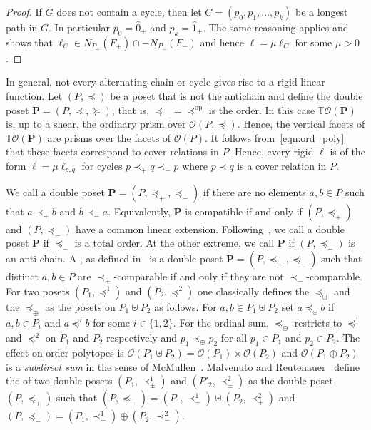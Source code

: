 \documentclass[11pt]{amsart}
\theoremstyle{definition}
\begin{document}
\begin{proof}
    If $G$ does not contain a cycle, then let $C = (p_0,p_1,\dots,p_k)$ be a
    longest path in $G$. In particular $p_0 = {\widehat{0}}_{\pm}$ and $p_k =
    {\widehat{1}}_{\pm}$. The same reasoning applies and shows that $\ell_C \in
    {N}_{{P}_+}(F_+) \cap -{N}_{{P}_-}(F_-)$ and hence $\ell = \mu
    \ell_C$ for some $\mu > 0$. 
\end{proof}

In general, not every alternating chain or cycle gives rise to a rigid linear
function. Let $({P},\preceq)$ be a poset that is not the antichain and define
the double poset ${\mathbf{P}} = ({P},\preceq,\succeq)$, that is, $\preceq_- =
\preceq^{\mathrm{op}}$ is the {\textbf{\color{black}{opposite}}} order. In this case
${{\mathbb{T}}{\mathcal{O}({\mathbf{P}})}}$ is, up to a shear, the ordinary prism over
${\mathcal{O}({{P},\preceq})}$. Hence, the vertical facets of ${{\mathbb{T}}{\mathcal{O}({\mathbf{P}})}}$ are prisms over
the facets of ${\mathcal{O}({P})}$. It follows from~\eqref{eqn:ord_poly} that these
facets correspond to cover relations in ${P}$. Hence, every rigid $\ell$ is of
the form $\ell = \mu \ell_{p,q}$ for cycles $p \prec_+ q \prec_- p$ where $p
\prec q$ is a cover relation in ${P}$.

We call a double poset ${\mathbf{P}} = ({P},\preceq_+,\preceq_-)$ {\textbf{\color{black}{compatible}}} if
there are no elements $a,b \in {P}$ such that $a \prec_+ b$ and $b \prec_- a$.
Equivalently, ${\mathbf{P}}$ is compatible if and only if $({P},\preceq_+)$ and
$({P},\preceq_-)$ have a common linear extension.
Following~\cite{MR}, we call a double poset ${\mathbf{P}}$
{\textbf{\color{black}{special}}} if $\preceq_-$ is a total order. At the other
extreme, we call ${\mathbf{P}}$ {\textbf{\color{black}{anti-special}}} if $({P},\preceq_-)$ is an anti-chain. A
{\textbf{\color{black}{plane poset}}}, as defined in~\cite{Foissy1} is a double poset
${\mathbf{P}} = ({P},\preceq_+,\preceq_-)$ such that distinct $a,b \in {P}$ are
$\prec_+$-comparable if and only if they are not $\prec_-$-comparable.  
For two posets $({P}_1,\preceq^1)$ and $({P}_2,\preceq^2)$ one classically
defines the {\textbf{\color{black}{disjoint union}}} $\preceq_\uplus$ and the {\textbf{\color{black}{ordinal sum}}}
$\preceq_\oplus$ as the posets on ${P}_1 \uplus {P}_2$ as follows. For $a,b \in
{P}_1 \uplus {P}_2$ set $a \preceq_{\uplus} b$ if $a,b \in {P}_i$ and $a
\preceq^i b$ for some $i \in \{1,2\}$. For the ordinal sum, $\preceq_\oplus$
restricts to $\preceq^1$ and $\preceq^2$ on ${P}_1$ and ${P}_2$ respectively and
$p_1 \prec_\oplus p_2$ for all $p_1 \in {P}_1$ and $p_2 \in {P}_2$. The effect
on order polytopes is ${\mathcal{O}({{P}_1 \uplus {P}_2})} = {\mathcal{O}({{P}_1})} \times {\mathcal{O}({{P}_2})}$
and ${\mathcal{O}({{P}_1 \oplus {P}_2})}$ is a \emph{subdirect sum} in the sense of
McMullen~\cite{mcmullen}. Malvenuto and Reutenauer~\cite{MR} define the
{\textbf{\color{black}{composition}}} of two double posets $({P}_1,\prec^1_\pm)$ and
$({P}'_2,\prec^2_\pm)$ as the double poset $({P},\preceq_\pm)$ such that
$({P},\preceq_+) = ({P}_1,\prec^1_+) \uplus ({P}_2,\prec^2_+)$ and
$({P},\preceq_-) = ({P}_1,\prec^1_-) \oplus ({P}_2,\prec^2_-)$.
\end{document}
